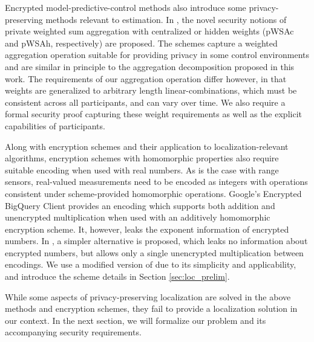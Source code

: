 \documentclass[10pt,letterpaper,oneside,twocolumn,journal]{IEEEtran}
\theoremstyle{definition}
\theoremstyle{definition}
\theoremstyle{remark}
\begin{document}
Encrypted model-predictive-control methods \cite{farokhiPrivacyDynamicalSystems2020} also introduce some privacy-preserving methods relevant to estimation. In \cite{alexandruEncryptedCooperativeControl2019,alexandruPrivateWeightedSum2020}, the novel security notions of private weighted sum aggregation with centralized or hidden weights (pWSAc and pWSAh, respectively) are proposed. The schemes capture a weighted aggregation operation suitable for providing privacy in some control environments and are similar in principle to the aggregation decomposition proposed in this work. The requirements of our aggregation operation differ however, in that weights are generalized to arbitrary length linear-combinations, which must be consistent across all participants, and can vary over time. We also require a formal security proof capturing these weight requirements as well as the explicit capabilities of participants.

Along with encryption schemes and their application to localization-relevant algorithms, encryption schemes with homomorphic properties also require suitable encoding when used with real numbers. As is the case with range sensors, real-valued measurements need to be encoded as integers with operations consistent under scheme-provided homomorphic operations. Google's Encrypted BigQuery Client \cite{googleEncryptedbigqueryclient2015} provides an encoding which supports both addition and unencrypted multiplication when used with an additively homomorphic encryption scheme. It, however, leaks the exponent information of encrypted numbers. In \cite{farokhiSecurePrivateControl2017}, a simpler alternative is proposed, which leaks no information about encrypted numbers, but allows only a single unencrypted multiplication between encodings. We use a modified version of \cite{farokhiSecurePrivateControl2017} due to its simplicity and applicability, and introduce the scheme details in Section \ref{sec:loc_prelim}.

While some aspects of privacy-preserving localization are solved in the above methods and encryption schemes, they fail to provide a localization solution in our context. In the next section, we will formalize our problem and its accompanying security requirements.

% 
%                                                                                
%                                                                                
%                                                                                
% 
\end{document}
